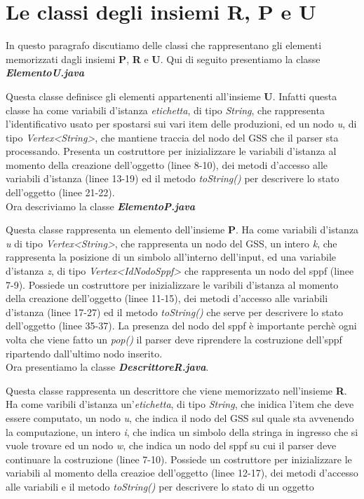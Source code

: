 \section{Le classi degli insiemi R, P e U}
In questo paragrafo discutiamo delle classi che rappresentano gli elementi memorizzati dagli insiemi \textbf{P}, \textbf{R} e \textbf{U}. Qui di seguito presentiamo la classe \textbf{\textit{ElementoU.java}}

Questa classe definisce gli elementi appartenenti all'insieme \textbf{U}. Infatti questa classe ha come variabili d'istanza \textit{etichetta}, di tipo \textit{String}, che rappresenta l'identificativo usato per spostarsi sui vari item delle produzioni, ed un nodo \textit{u}, di tipo \textit{Vertex<String>}, che mantiene traccia del nodo del GSS che il parser sta processando. Presenta un costruttore per inizializzare le variabili d'istanza al momento della creazione dell'oggetto (linee 8-10), dei metodi d'accesso alle variabili d'istanza (linee 13-19) ed il metodo \textit{ toString()} per descrivere lo stato dell'oggetto (linee 21-22).\\
Ora descriviamo la classe \textbf{\textit{ElementoP.java}}

Questa classe rappresenta un elemento dell'insieme \textbf{P}. Ha come variabili d'istanza \textit{u} di tipo \textit{Vertex<String>}, che rappresenta un nodo del GSS, un intero \textit{k}, che rappresenta la posizione di un simbolo all'interno dell'input, ed una variabile d'istanza \textit{z}, di tipo \textit{Vertex<IdNodoSppf>} che rappresenta un nodo del sppf (linee 7-9). Possiede un costruttore  per inizializzare le varibili d'istanza al momento della creazione dell'oggetto (linee 11-15), dei metodi d'accesso alle variabili d'istanza (linee 17-27) ed il metodo \textit{toString()} che serve per descrivere lo stato dell'oggetto (linee 35-37). La presenza del nodo del sppf è importante perchè ogni volta che viene fatto un \textit{pop()} il parser deve riprendere la costruzione dell'sppf ripartendo dall'ultimo nodo inserito.\\
Ora presentiamo la classe \textbf{\textit{DescrittoreR.java}}.

Questa classe rappresenta un descrittore che viene memorizzato nell'insieme \textbf{R}. Ha come varibili d'istanza un'\textit{etichetta}, di tipo \textit{String}, che inidica l'item che deve essere computato, un nodo \textit{u}, che indica il nodo del GSS sul quale sta avvenendo la computazione, un intero \textit{i}, che indica un simbolo della stringa in ingresso che si vuole trovare ed un nodo \textit{w}, che indica un nodo del sppf su cui il parser deve continuare la costruzione (linee 7-10). Possiede un costruttore per inizializzare le variabili al momento della creazioe dell'oggetto (linee 12-17), dei metodi d'accesso alle variabili e il metodo \textit{toString()} per descrivere lo stato di un oggetto
